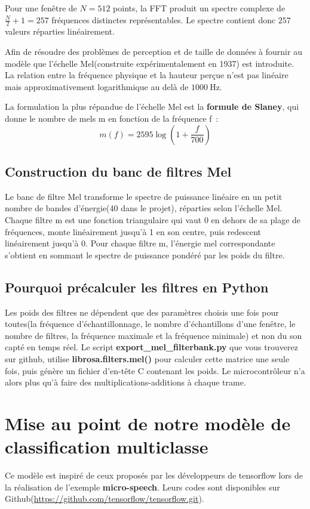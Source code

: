 \documentclass[a4paper,12pt,twoside]{report}
\theoremstyle{definition}
\theoremstyle{plain}
\theoremstyle{remark}
\begin{document}
Pour une fenêtre de $N=512$ points, la \ac{FFT} produit un spectre complexe de $\frac{N}{2} + 1=257$ fréquences distinctes représentables. Le spectre contient donc $257$ valeurs réparties linéairement.

Afin de résoudre des problèmes de perception et de taille de données à fournir au modèle que l'échelle Mel(construite expérimentalement en 1937) est introduite. La relation entre la fréquence physique et la hauteur perçue n'est pas linéaire mais approximativement logarithmique au delà de $\SI{1000}{\hertz}$.

La formulation la plus répandue de l'échelle Mel est la \textbf{formule de Slaney}, qui donne le nombre de mels m en fonction de la fréquence f~:
\[m(f) = 2595 \log(1 + \frac{f}{700})\]

\subsection{Construction du banc de filtres Mel}
Le banc de filtre Mel transforme le spectre de puissance linéaire en un petit nombre de bandes d'énergie(40 dans le projet), réparties selon l'échelle Mel. Chaque filtre m est une fonction triangulaire qui vaut 0 en dehors de sa plage de fréquences, monte linéairement jusqu'à 1 en son centre, puis redescent linéairement jusqu'à 0. Pour chaque filtre m, l'énergie mel correspondante s'obtient en sommant le spectre de puissance pondéré par les poids du filtre.
\subsection{Pourquoi précalculer les filtres en Python}
Les poids des filtres ne dépendent que des paramètres choisis une fois pour toutes(la fréquence d'échantillonnage, le nombre d'échantillons d'une fenêtre, le nombre de filtres, la fréquence maximale et la fréquence minimale) et non du son capté en temps réel. Le script \textbf{export\_mel\_filterbank.py} que vous trouverez sur github, utilise \textbf{librosa.filters.mel()} pour calculer cette matrice une seule fois, puis génère un fichier d'en-tête C contenant les poids. Le microcontrôleur n'a alors plus qu'à faire des multiplications-additions à chaque trame.

\section{Mise au point de notre modèle de classification multiclasse}

Ce modèle est inspiré de ceux proposés par les développeurs de tensorflow lors de la réalisation de l'exemple \textbf{micro-speech}. Leurs codes sont disponibles sur Github(\url{https://github.com/tensorflow/tensorflow.git}). 
\end{document}
